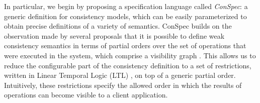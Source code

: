 \documentclass[journal, compsoc]{IEEEtran}
\begin{document}
	
	
	
	In particular, we begin by proposing a specification language called
	\emph{ConSpec}: a generic definition for consistency models, which can
	be easily parameterized to obtain precise definitions of a variety of
	semantics. ConSpec builds on the observation made by several proposals
	that it is possible to define weak consistency semantics in terms of
	partial orders over the set of operations that were executed in the
	system, which comprise a visibility graph
	\cite{Li:2012:MGS:2387880.2387906, Gotsman:2016:CIS:2837614.2837625, cheng-papoc}. This allows us to reduce
	the configurable part of the consistency definition to a set of restrictions,
	written in Linear Temporal Logic (LTL) \cite{4567924}, on top of a generic partial order.
	Intuitively, these restrictions specify the allowed order in which the results of operations can become visible to a client application.
	
\end{document}
